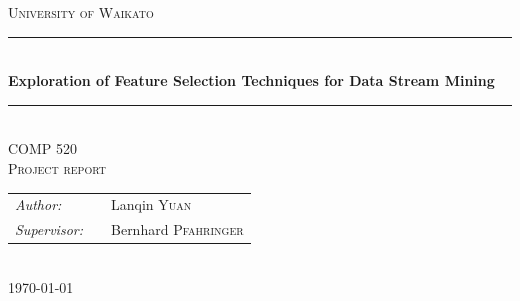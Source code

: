 \begin{titlepage}

\newcommand{\HRule}{\rule{\linewidth}{0.5mm}} %

\center %
 

\textsc{\Large University of Waikato}\\[5cm] %


\HRule \\[0.4cm]
{ \huge \bfseries Exploration of Feature Selection Techniques for Data Stream Mining}\\[0.2cm] %
\HRule \\[0.4cm]
 
\textsc{\LARGE COMP 520}\\[0.1cm] %
\textsc{\large Project report}\\[0.4cm] %

\begin{minipage}{0.4\textwidth}
\begin{tabular}{l l l}
\large
\emph{Author:} & & Lanqin \textsc{Yuan} \\
\emph{Supervisor:} & & Bernhard \textsc{Pfahringer}

\end{tabular}
\end{minipage} \\[0.5cm]

{\today} %


\vfill %



\end{titlepage}
